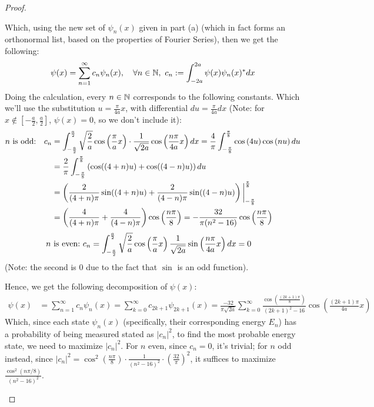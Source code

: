 \documentclass{article}
\begin{document}
\begin{proof}
\begin{itemize}
        Which, using the new set of $\psi_n(x)$ given in part (a) (which in fact forms an orthonormal list, based on the properties of Fourier Series), then we get the following:
        \begin{align}
            \psi(x)=\sum_{n=1}^{\infty}c_n \psi_n(x),\quad \forall n\in\mathbb{N},\ c_n:=\int_{-2a}^{2a}\psi(x)\psi_n(x)^* dx
        \end{align}
        Doing the calculation, every $n\in\mathbb{N}$ corresponds to the following constants. Which we'll use the substitution $u=\frac{\pi}{4a}x$, with differential $du=\frac{\pi}{4a}dx$ (Note: for $x\notin [-\frac{a}{2},\frac{a}{2}]$, $\psi(x)=0$, so we don't include it):
        \begin{align}
            n\textmd{ is odd:}\quad c_n &= \int_{-\frac{a}{2}}^{\frac{a}{2}}\sqrt{\frac{2}{a}}\cos\left(\frac{\pi}{a}x\right)\cdot \frac{1}{\sqrt{2a}} \cos\left(\frac{n\pi}{4a}x\right) dx = \frac{4}{\pi}\int_{-\frac{\pi}{8}}^{\frac{\pi}{8}}\cos\left(4u\right)\cos\left(n u\right)du\\
            &= \frac{2}{\pi}\int_{-\frac{\pi}{8}}^{\frac{\pi}{8}}\left(\cos((4+n)u)+\cos((4-n)u)\right)du \\
            &= \left(\frac{2}{(4+n)\pi}\sin((4+n)u)+\frac{2}{(4-n)\pi}\sin((4-n)u)\right)\bigg|_{-\frac{\pi}{8}}^{\frac{\pi}{8}}\\
            &= \left(\frac{4}{(4+n)\pi}+\frac{4}{(4-n)\pi}\right)\cos\left(\frac{n\pi}{8}\right) = -\frac{32}{\pi(n^2-16)}\cos\left(\frac{n\pi}{8}\right)
        \end{align}
        \begin{align}
            n\textmd{ is even:}\ c_n&=\int_{-\frac{a}{2}}^{\frac{a}{2}}\sqrt{\frac{2}{a}}\cos\left(\frac{\pi}{a}x\right)\frac{1}{\sqrt{2a}}\sin\left(\frac{n\pi}{4a}x\right) dx = 0
        \end{align}
        (Note: the second is $0$ due to the fact that $\sin$ is an odd function).

        Hence, we get the following decomposition of $\psi(x)$:
        \begin{align}
            \psi(x)&=\sum_{n=1}^{\infty}c_n\psi_n(x)=\sum_{k=0}^{\infty}c_{2k+1}\psi_{2k+1}(x) = \frac{-32}{\pi\sqrt{2a}}\sum_{k=0}^{\infty}\frac{\cos\left(\frac{(2k+1)\pi}{8}\right)}{(2k+1)^2-16}\cos\left(\frac{(2k+1)\pi}{4a}x\right)
        \end{align}
        Which, since each state $\psi_n(x)$ (specifically, their corresponding energy $E_n$) has a probability of being measured stated as $|c_n|^2$, to find the most probable energy state, we need to maximize $|c_n|^2$. For $n$ even, since $c_n=0$, it's trivial; for $n$ odd instead, since $|c_n|^2=\cos^2(\frac{n\pi}{8})\cdot\frac{1}{(n^2-16)^2}\cdot \left(\frac{32}{\pi}\right)^2$, it suffices to maximize $\frac{\cos^2(n\pi/8)}{(n^2-16)^2}$.


\end{itemize}
\end{proof}
\end{document}
